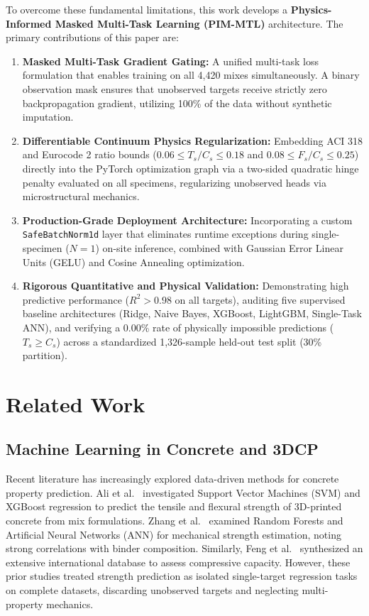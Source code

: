 \documentclass[conference]{IEEEtran}
\begin{document}
To overcome these fundamental limitations, this work develops a \textbf{Physics-Informed Masked Multi-Task Learning (PIM-MTL)} architecture. The primary contributions of this paper are:
\begin{enumerate}
    \item \textbf{Masked Multi-Task Gradient Gating:} A unified multi-task loss formulation that enables training on all 4,420 mixes simultaneously. A binary observation mask ensures that unobserved targets receive strictly zero backpropagation gradient, utilizing 100\% of the data without synthetic imputation.
    \item \textbf{Differentiable Continuum Physics Regularization:} Embedding ACI 318 and Eurocode 2 ratio bounds ($0.06 \le T_s/C_s \le 0.18$ and $0.08 \le F_s/C_s \le 0.25$) directly into the PyTorch optimization graph via a two-sided quadratic hinge penalty evaluated on all specimens, regularizing unobserved heads via microstructural mechanics.
    \item \textbf{Production-Grade Deployment Architecture:} Incorporating a custom \texttt{SafeBatchNorm1d} layer that eliminates runtime exceptions during single-specimen ($N=1$) on-site inference, combined with Gaussian Error Linear Units (GELU) and Cosine Annealing optimization.
    \item \textbf{Rigorous Quantitative and Physical Validation:} Demonstrating high predictive performance ($R^2 > 0.98$ on all targets), auditing five supervised baseline architectures (Ridge, Naive Bayes, XGBoost, LightGBM, Single-Task ANN), and verifying a 0.00\% rate of physically impossible predictions ($T_s \ge C_s$) across a standardized 1,326-sample held-out test split (30\% partition).
\end{enumerate}

\section{Related Work}

\subsection{Machine Learning in Concrete and 3DCP}
Recent literature has increasingly explored data-driven methods for concrete property prediction. Ali et al.~\cite{ali2023machine} investigated Support Vector Machines (SVM) and XGBoost regression to predict the tensile and flexural strength of 3D-printed concrete from mix formulations. Zhang et al.~\cite{zhang2025research} examined Random Forests and Artificial Neural Networks (ANN) for mechanical strength estimation, noting strong correlations with binder composition. Similarly, Feng et al.~\cite{feng2021machine} synthesized an extensive international database to assess compressive capacity. However, these prior studies treated strength prediction as isolated single-target regression tasks on complete datasets, discarding unobserved targets and neglecting multi-property mechanics.
\end{document}
